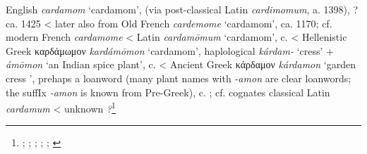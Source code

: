 \begin{etymology}\label{ety:cardamom}
English \textit{cardamom} `cardamom', (via post-classical Latin \textit{cardimomum}, a. 1398), ?ca. 1425
< later also from Old French \textit{cardemome} `cardamom', ca. 1170; cf. modern French \textit{cardamome}
< Latin \textit{cardamōmum} `cardamom',  c. \AD{}
< Hellenistic Greek {καρδάμωμον} \textit{kardámōmon} `cardamom', haplological  \textit{kárdam-} `cress' +  \textit{ámōmon} `an Indian spice plant',  c. \BC{}
< Ancient Greek {κάρδαμον} \textit{kárdamon} `garden cress ', prehaps a loanword (many plant names with \textit{-amon} are clear loanwords; the suffIx \textit{-amon} is known from Pre-Greek),  c. \BC{}; cf. cognates classical Latin \textit{cardamum}
< unknown \textit{?}\footnote{\textcite[s.v. cardamom]{oed}; \textcite[s.v. cardamome]{tlfi}; \textcite[s.v. cardamomum]{lewis_latin_1879}; \textcite[s.v. καρδάμωμον]{liddell_greek-english_1940}; \textcite[s.v. κάρδαμον]{liddell_greek-english_1940}; \textcite[644]{beekes_etymological_2010}}
\end{etymology}